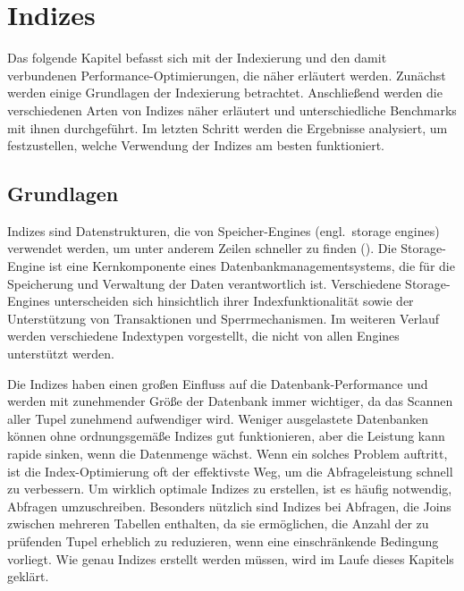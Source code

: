 
\chapter{Indizes}\label{ch:indexes}

Das folgende Kapitel befasst sich mit der Indexierung und den damit verbundenen Performance-Optimierungen, die näher erläutert werden.
Zunächst werden einige Grundlagen der Indexierung betrachtet.
Anschließend werden die verschiedenen Arten von Indizes näher erläutert und unterschiedliche Benchmarks mit ihnen durchgeführt.
Im letzten Schritt werden die Ergebnisse analysiert, um festzustellen, welche Verwendung der Indizes am besten funktioniert.

\section{Grundlagen}\label{sec:indexing-grundlagen}

Indizes sind Datenstrukturen, die von Speicher-Engines (engl.\ storage engines) verwendet werden, um unter anderem Zeilen schneller zu finden (\cite[S. 147--189]{schwartz2012high}).
Die Storage-Engine ist eine Kernkomponente eines Datenbankmanagementsystems, die für die Speicherung und Verwaltung der Daten verantwortlich ist.
Verschiedene Storage-Engines unterscheiden sich hinsichtlich ihrer Indexfunktionalität sowie der Unterstützung von Transaktionen und Sperrmechanismen.
Im weiteren Verlauf werden verschiedene Indextypen vorgestellt, die nicht von allen Engines unterstützt werden.

Die Indizes haben einen großen Einfluss auf die Datenbank-Performance und werden mit zunehmender Größe der Datenbank immer wichtiger, da das Scannen aller Tupel zunehmend aufwendiger wird.
Weniger ausgelastete Datenbanken können ohne ordnungsgemäße Indizes gut funktionieren, aber die Leistung kann rapide sinken, wenn die Datenmenge wächst.
Wenn ein solches Problem auftritt, ist die Index-Optimierung oft der effektivste Weg, um die Abfrageleistung schnell zu verbessern.
Um wirklich optimale Indizes zu erstellen, ist es häufig notwendig, Abfragen umzuschreiben.
Besonders nützlich sind Indizes bei Abfragen, die Joins zwischen mehreren Tabellen enthalten, da sie ermöglichen, die Anzahl der zu prüfenden Tupel erheblich zu reduzieren, wenn eine einschränkende Bedingung vorliegt.
Wie genau Indizes erstellt werden müssen, wird im Laufe dieses Kapitels geklärt.


